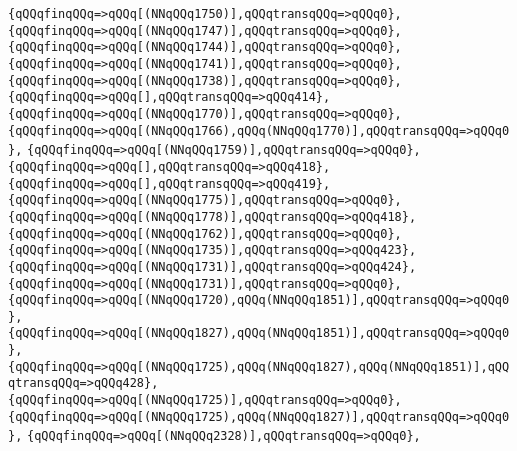 \verb|{qQQqfinqQQq=>qQQq[(NNqQQq1750)],qQQqtransqQQq=>qQQq0},|\newline
\verb|{qQQqfinqQQq=>qQQq[(NNqQQq1747)],qQQqtransqQQq=>qQQq0},|\newline
\verb|{qQQqfinqQQq=>qQQq[(NNqQQq1744)],qQQqtransqQQq=>qQQq0},|\newline
\verb|{qQQqfinqQQq=>qQQq[(NNqQQq1741)],qQQqtransqQQq=>qQQq0},|\newline
\verb|{qQQqfinqQQq=>qQQq[(NNqQQq1738)],qQQqtransqQQq=>qQQq0},|\newline
\verb|{qQQqfinqQQq=>qQQq[],qQQqtransqQQq=>qQQq414},|\newline
\verb|{qQQqfinqQQq=>qQQq[(NNqQQq1770)],qQQqtransqQQq=>qQQq0},|\newline
\verb|{qQQqfinqQQq=>qQQq[(NNqQQq1766),qQQq(NNqQQq1770)],qQQqtransqQQq=>qQQq0},|\newline
\verb|{qQQqfinqQQq=>qQQq[(NNqQQq1759)],qQQqtransqQQq=>qQQq0},|\newline
\verb|{qQQqfinqQQq=>qQQq[],qQQqtransqQQq=>qQQq418},|\newline
\verb|{qQQqfinqQQq=>qQQq[],qQQqtransqQQq=>qQQq419},|\newline
\verb|{qQQqfinqQQq=>qQQq[(NNqQQq1775)],qQQqtransqQQq=>qQQq0},|\newline
\verb|{qQQqfinqQQq=>qQQq[(NNqQQq1778)],qQQqtransqQQq=>qQQq418},|\newline
\verb|{qQQqfinqQQq=>qQQq[(NNqQQq1762)],qQQqtransqQQq=>qQQq0},|\newline
\verb|{qQQqfinqQQq=>qQQq[(NNqQQq1735)],qQQqtransqQQq=>qQQq423},|\newline
\verb|{qQQqfinqQQq=>qQQq[(NNqQQq1731)],qQQqtransqQQq=>qQQq424},|\newline
\verb|{qQQqfinqQQq=>qQQq[(NNqQQq1731)],qQQqtransqQQq=>qQQq0},|\newline
\verb|{qQQqfinqQQq=>qQQq[(NNqQQq1720),qQQq(NNqQQq1851)],qQQqtransqQQq=>qQQq0},|\newline
\verb|{qQQqfinqQQq=>qQQq[(NNqQQq1827),qQQq(NNqQQq1851)],qQQqtransqQQq=>qQQq0},|\newline
\verb|{qQQqfinqQQq=>qQQq[(NNqQQq1725),qQQq(NNqQQq1827),qQQq(NNqQQq1851)],qQQqtransqQQq=>qQQq428},|\newline
\verb|{qQQqfinqQQq=>qQQq[(NNqQQq1725)],qQQqtransqQQq=>qQQq0},|\newline
\verb|{qQQqfinqQQq=>qQQq[(NNqQQq1725),qQQq(NNqQQq1827)],qQQqtransqQQq=>qQQq0},|\newline
\verb|{qQQqfinqQQq=>qQQq[(NNqQQq2328)],qQQqtransqQQq=>qQQq0},|\newline
